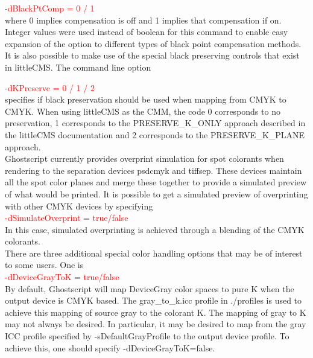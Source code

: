 \documentclass[12pt,notitlepage]{article}
\begin{document}
\textcolor{red}{-dBlackPtComp = 0 / 1}\\

\noindent where 0 implies compensation is off and 1 implies that compensation if on.  Integer values were used instead of boolean for this command to enable easy expansion of the option to different types of black point compensation methods.\\

It is also possible to make use of the special black preserving controls that exist in littleCMS.  The command line option

\textcolor{red}{-dKPreserve = 0 / 1 / 2}\\

\noindent specifies if black preservation should be used when mapping from CMYK to CMYK.   When using littleCMS as the CMM, the code 0
corresponds to no preservation, 1 corresponds to the PRESERVE\_K\_ONLY approach described in the littleCMS documentation and 2 corresponds to the PRESERVE\_K\_PLANE approach.\\

Ghostscript currently provides overprint simulation for spot colorants when rendering to the separation devices psdcmyk and tiffsep.  These devices maintain all the spot color planes and merge these together to provide a simulated preview of what would be printed.  It is possible to get a simulated preview of overprinting with other CMYK devices by specifying\\

\textcolor{red}{-dSimulateOverprint = true/false}\\

In this case, simulated overprinting is achieved through a blending of the CMYK colorants.\\

There are three additional special color handling options that may be of interest to some users.  One is\\

\textcolor{red}{-dDeviceGrayToK = true/false}\\

\noindent By default, Ghostscript will map DeviceGray color spaces to pure K when the output device is CMYK based. The gray\_to\_k.icc profile in ./profiles is used to achieve this mapping of source gray to the colorant K.  The mapping of gray to K may not always be desired. In particular, it may be desired to map from the gray ICC profile specified by -sDefaultGrayProfile to the output device profile. To achieve this, one should specify -dDeviceGrayToK=false.\\
\end{document}
